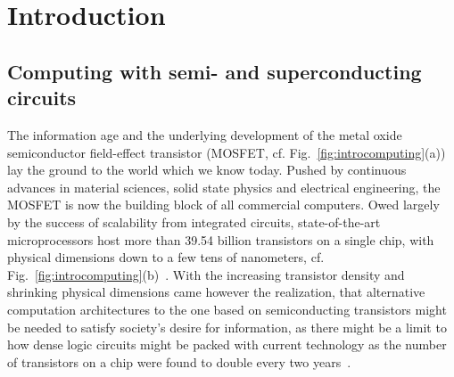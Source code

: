\newchapstyle
\chapter{Introduction}
\label{chap:intro}



\afterpage{\pagecolor{none}}\newpage

\section{Computing with semi- and superconducting circuits}

The information age and the underlying development of the metal oxide semiconductor field-effect transistor (MOSFET, cf. Fig.~\ref{fig:introcomputing}(a)) lay the ground to the world which we know today.
%
Pushed by continuous advances in material sciences, solid state physics and electrical engineering, the MOSFET is now the building block of all commercial computers.
%
Owed largely by the success of scalability from integrated circuits, state-of-the-art microprocessors host more than 39.54 billion transistors on a single chip, with physical dimensions down to a few tens of nanometers, cf. Fig.~\ref{fig:introcomputing}(b)~\cite{mujtabaAMDEPYCRome2019}.
%
With the increasing transistor density and shrinking physical dimensions came however the realization, that alternative computation architectures to the one based on semiconducting transistors might be needed to satisfy society's desire for information, as there might be a limit to how dense logic circuits might be packed with current technology as the number of transistors on a chip were found to double every two years~\cite{mooreCrammingMoreComponents2006}.

